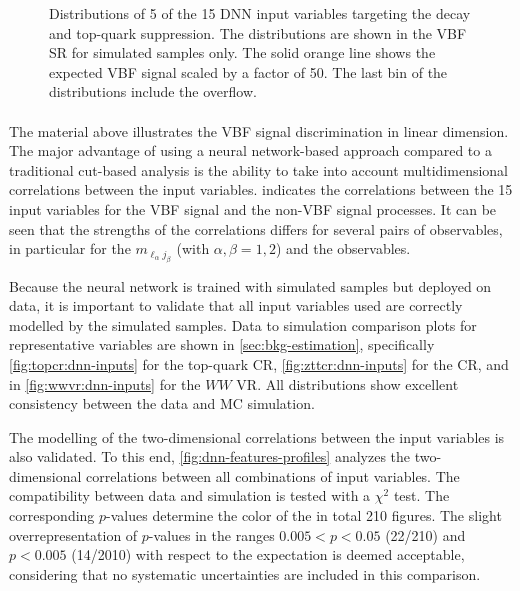 \begin{figure}[ht]
{    }
    {\caption{
            Distributions of 5 of the 15 DNN input variables targeting the \HWW decay and top-quark suppression. The distributions are shown in the VBF SR for simulated samples only. The solid orange line shows the expected VBF signal scaled by a factor of 50. The last bin of the distributions include the overflow.
            \label{fig:dnn-inputs-post-fit2} }}
\end{figure}
\captionsetup[subfloat]{captionskip=7pt} %

\paragraph{}
The material above illustrates the VBF signal discrimination in linear dimension. The major advantage of using a neural network-based approach compared to a traditional cut-based analysis is the ability to take into account multidimensional correlations between the input variables.  indicates the correlations between the 15 input variables for the VBF signal and the non-VBF signal processes. It can be seen that the strengths of the correlations differs for several pairs of observables, in particular for the $m_{\ell_\alpha j_\beta}$ (with $\alpha, \beta = 1, 2$) and the \pTjthree observables.

Because the neural network is trained with simulated samples but deployed on data, it is important to validate that all input variables used are correctly modelled by the simulated samples.
Data to simulation comparison plots for representative variables are shown in \cref{sec:bkg-estimation}, specifically \cref{fig:topcr:dnn-inputs} for the top-quark CR, \cref{fig:zttcr:dnn-inputs} for the \Ztautau CR, and in \cref{fig:wwvr:dnn-inputs} for the $WW$ VR. All distributions show excellent consistency between the data and MC simulation.

The modelling of the two-dimensional correlations between the input variables is also validated.
To this end, \cref{fig:dnn-features-profiles} analyzes the two-dimensional correlations between all combinations of input variables. The compatibility between data and simulation is tested with a $\chi^2$ test.
The corresponding $p$-values determine the color of the in total 210 figures.
The slight overrepresentation of $p$-values in the ranges $0.005 < p < 0.05$ (22/210) and $p < 0.005$ (14/2010) with respect to the expectation is deemed acceptable, considering that no systematic uncertainties are included in this comparison.

